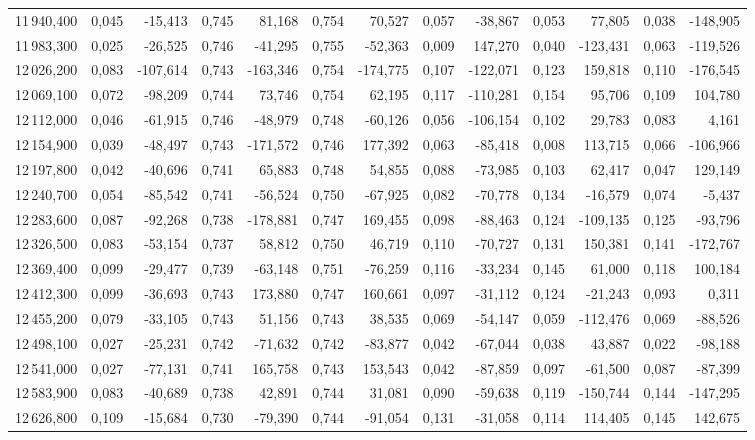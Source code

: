 \begin{longtable}{rrrrrrrrrrrrr}
11\,940,400 & 0,045 & -15,413 & 0,745 & 81,168 & 0,754 & 70,527 & 0,057 & -38,867 & 0,053 & 77,805 & 0,038 & -148,905\\
11\,983,300 & 0,025 & -26,525 & 0,746 & -41,295 & 0,755 & -52,363 & 0,009 & 147,270 & 0,040 & -123,431 & 0,063 & -119,526\\
12\,026,200 & 0,083 & -107,614 & 0,743 & -163,346 & 0,754 & -174,775 & 0,107 & -122,071 & 0,123 & 159,818 & 0,110 & -176,545\\
12\,069,100 & 0,072 & -98,209 & 0,744 & 73,746 & 0,754 & 62,195 & 0,117 & -110,281 & 0,154 & 95,706 & 0,109 & 104,780\\
12\,112,000 & 0,046 & -61,915 & 0,746 & -48,979 & 0,748 & -60,126 & 0,056 & -106,154 & 0,102 & 29,783 & 0,083 & 4,161\\
12\,154,900 & 0,039 & -48,497 & 0,743 & -171,572 & 0,746 & 177,392 & 0,063 & -85,418 & 0,008 & 113,715 & 0,066 & -106,966\\
12\,197,800 & 0,042 & -40,696 & 0,741 & 65,883 & 0,748 & 54,855 & 0,088 & -73,985 & 0,103 & 62,417 & 0,047 & 129,149\\
12\,240,700 & 0,054 & -85,542 & 0,741 & -56,524 & 0,750 & -67,925 & 0,082 & -70,778 & 0,134 & -16,579 & 0,074 & -5,437\\
12\,283,600 & 0,087 & -92,268 & 0,738 & -178,881 & 0,747 & 169,455 & 0,098 & -88,463 & 0,124 & -109,135 & 0,125 & -93,796\\
12\,326,500 & 0,083 & -53,154 & 0,737 & 58,812 & 0,750 & 46,719 & 0,110 & -70,727 & 0,131 & 150,381 & 0,141 & -172,767\\
12\,369,400 & 0,099 & -29,477 & 0,739 & -63,148 & 0,751 & -76,259 & 0,116 & -33,234 & 0,145 & 61,000 & 0,118 & 100,184\\
12\,412,300 & 0,099 & -36,693 & 0,743 & 173,880 & 0,747 & 160,661 & 0,097 & -31,112 & 0,124 & -21,243 & 0,093 & 0,311\\
12\,455,200 & 0,079 & -33,105 & 0,743 & 51,156 & 0,743 & 38,535 & 0,069 & -54,147 & 0,059 & -112,476 & 0,069 & -88,526\\
12\,498,100 & 0,027 & -25,231 & 0,742 & -71,632 & 0,742 & -83,877 & 0,042 & -67,044 & 0,038 & 43,887 & 0,022 & -98,188\\
12\,541,000 & 0,027 & -77,131 & 0,741 & 165,758 & 0,743 & 153,543 & 0,042 & -87,859 & 0,097 & -61,500 & 0,087 & -87,399\\
12\,583,900 & 0,083 & -40,689 & 0,738 & 42,891 & 0,744 & 31,081 & 0,090 & -59,638 & 0,119 & -150,744 & 0,144 & -147,295\\
12\,626,800 & 0,109 & -15,684 & 0,730 & -79,390 & 0,744 & -91,054 & 0,131 & -31,058 & 0,114 & 114,405 & 0,145 & 142,675\\

\end{longtable}

